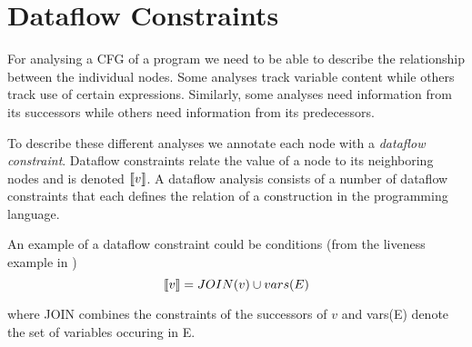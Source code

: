 \section{Dataflow Constraints}
For analysing a CFG of a program we need to be able to describe the relationship between the individual nodes.
Some analyses track variable content while others track use of certain expressions.
Similarly, some analyses need information from its successors while others need information from its predecessors.

To describe these different analyses we annotate each node with a \emph{dataflow constraint}.
Dataflow constraints relate the value of a node to its neighboring nodes and is denoted $\llbracket v \rrbracket$.
A dataflow analysis consists of a number of dataflow constraints that each defines the relation of a construction in the programming language.

An example of a dataflow constraint could be conditions (from the liveness example in \citet{schwartzbach})
\[ \llbracket v \rrbracket = JOIN(v) \cup vars(E) \]

where JOIN combines the constraints of the successors of $v$ and vars(E) denote the set of variables occuring in E.
